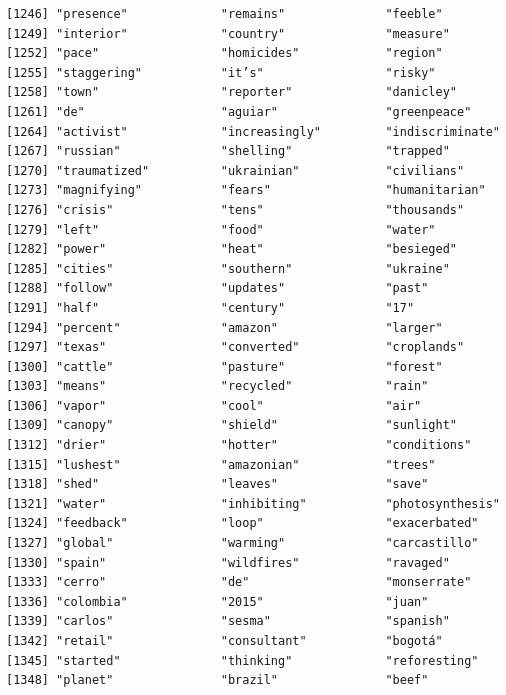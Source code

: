 \documentclass[
  letterpaper,
  DIV=11,
  numbers=noendperiod]{scrartcl}
\begin{document}
\begin{verbatim}
[1246] "presence"             "remains"              "feeble"              
[1249] "interior"             "country"              "measure"             
[1252] "pace"                 "homicides"            "region"              
[1255] "staggering"           "it’s"                 "risky"               
[1258] "town"                 "reporter"             "danicley"            
[1261] "de"                   "aguiar"               "greenpeace"          
[1264] "activist"             "increasingly"         "indiscriminate"      
[1267] "russian"              "shelling"             "trapped"             
[1270] "traumatized"          "ukrainian"            "civilians"           
[1273] "magnifying"           "fears"                "humanitarian"        
[1276] "crisis"               "tens"                 "thousands"           
[1279] "left"                 "food"                 "water"               
[1282] "power"                "heat"                 "besieged"            
[1285] "cities"               "southern"             "ukraine"             
[1288] "follow"               "updates"              "past"                
[1291] "half"                 "century"              "17"                  
[1294] "percent"              "amazon"               "larger"              
[1297] "texas"                "converted"            "croplands"           
[1300] "cattle"               "pasture"              "forest"              
[1303] "means"                "recycled"             "rain"                
[1306] "vapor"                "cool"                 "air"                 
[1309] "canopy"               "shield"               "sunlight"            
[1312] "drier"                "hotter"               "conditions"          
[1315] "lushest"              "amazonian"            "trees"               
[1318] "shed"                 "leaves"               "save"                
[1321] "water"                "inhibiting"           "photosynthesis"      
[1324] "feedback"             "loop"                 "exacerbated"         
[1327] "global"               "warming"              "carcastillo"         
[1330] "spain"                "wildfires"            "ravaged"             
[1333] "cerro"                "de"                   "monserrate"          
[1336] "colombia"             "2015"                 "juan"                
[1339] "carlos"               "sesma"                "spanish"             
[1342] "retail"               "consultant"           "bogotá"              
[1345] "started"              "thinking"             "reforesting"         
[1348] "planet"               "brazil"               "beef"                

\end{verbatim}
\end{document}
